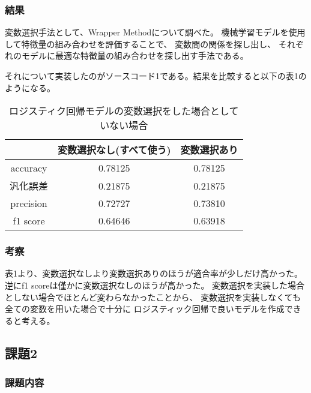 \documentclass[12pt]{jarticle}
\begin{document}
\subsubsection*{結果}

変数選択手法として、Wrapper Methodについて調べた。
機械学習モデルを使用して特徴量の組み合わせを評価することで、
変数間の関係を探し出し、
それぞれのモデルに最適な特徴量の組み合わせを探し出す手法である。

それについて実装したのがソースコード1である。結果を比較すると以下の表1のようになる。

\begin{table}[htb]
    \caption{ロジスティク回帰モデルの変数選択をした場合としていない場合}
    \begin{center}
        \begin{tabular}{|c||c|c|}
            \hline
                      & 変数選択なし(すべて使う) & 変数選択あり \\ \hline \hline
            accuracy  & 0.78125                  & 0.78125      \\ \hline
            汎化誤差  & 0.21875                  & 0.21875      \\ \hline
            precision & 0.72727                  & 0.73810      \\ \hline
            f1 score  & 0.64646                  & 0.63918      \\ \hline
        \end{tabular}
    \end{center}
\end{table}

\clearpage

\subsubsection*{考察}
表1より、変数選択なしより変数選択ありのほうが適合率が少しだけ高かった。
逆にf1 scoreは僅かに変数選択なしのほうが高かった。
変数選択を実装した場合としない場合でほとんど変わらなかったことから、
変数選択を実装しなくても全ての変数を用いた場合で十分に
ロジスティック回帰で良いモデルを作成できると考える。

\subsection{課題2}
\subsubsection*{課題内容}
\end{document}
